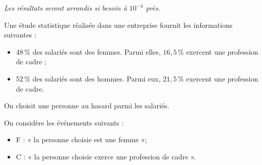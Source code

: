 \textit{Les résultats seront arrondis si besoin à $10^{-4}$ près.}

\medskip

Une étude statistique réalisée dans une entreprise fournit les informations suivantes :

\begin{itemize}
	\item 48\,\% des salariés sont des femmes. Parmi elles, $16,5$\,\% exercent une profession de cadre ; 
	\item 52\,\% des salariés sont des hommes. Parmi eux, $21,5$\,\% exercent une profession de cadre.
\end{itemize}

On choisit une personne au hasard parmi les salariés.

On considère les événements suivants :

\begin{itemize}
	\item F : « la personne choisie est une femme »;
	\item C : « la personne choisie exerce une profession de cadre ». 
\end{itemize}

